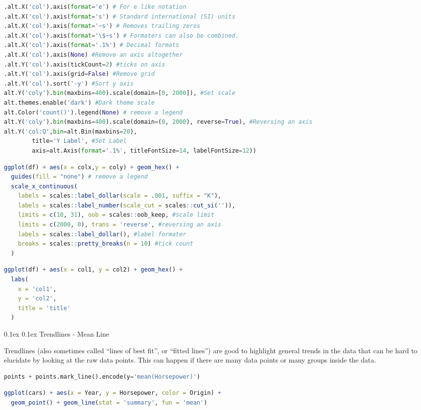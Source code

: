 \documentclass[8pt,landscape]{article}
\makeatletter
\renewcommand{\subsection}{\@startsection{subsection}{2}{0pt}%
    {0.1ex}%
    {0.1ex}%
    {\fontsize{8}{9}\bfseries\color{blue}}} %
\newcommand{\smalltext}[1]{%
  {\fontsize{8}{9}\selectfont\sloppy #1\par}%
}
\makeatother
\begin{document}
\begin{multicols}{3}
\begin{lstlisting}[language=Python]
.alt.X('col').axis(format='e') # For e like notation
.alt.X('col').axis(format='s') # Standard international (SI) units
.alt.X('col').axis(format='~s') # Removes trailing zeros
.alt.X('col').axis(format='\$~s') # Formaters can also be combined.
.alt.X('col').axis(format='.1%') # Decimal formats
.alt.X('col').axis(None) #Remove an axis altogether
.alt.Y('col').axis(tickCount=2) #ticks on axis
.alt.Y('col').axis(grid=False) #Remove grid
.alt.Y('col').sort('-y') #Sort y axis
alt.Y('coly').bin(maxbins=400).scale(domain=[0, 2000]), #Set scale
alt.themes.enable('dark') #Dark theme scale
alt.Color('count()').legend(None) # remove a legend 
alt.Y('coly').bin(maxbins=400).scale(domain=(0, 2000), reverse=True), #Reversing an axis
alt.Y('col:Q',bin=alt.Bin(maxbins=20),
        title='Y Label', #Set Label
        axis=alt.Axis(format='.1%', titleFontSize=14, labelFontSize=12))
\end{lstlisting}
\begin{lstlisting}[language=R]
ggplot(df) + aes(x = colx,y = coly) + geom_hex() +
  guides(fill = "none") # remove a legend 
  scale_x_continuous(
    labels = scales::label_dollar(scale = .001, suffix = "K"),
    labels = scales::label_number(scale_cut = scales::cut_si('')),
    limits = c(10, 31), oob = scales::oob_keep, #scale limit
    limits = c(2000, 0), trans = 'reverse', #reversing an axis
    labels = scales::label_dollar(), #label formater
    breaks = scales::pretty_breaks(n = 10) #tick count
  )
\end{lstlisting}
\begin{lstlisting}[language=R]
ggplot(df) + aes(x = col1, y = col2) + geom_hex() +
  labs(
    x = 'col1',
    y = 'col2',
    title = 'title'
  )
\end{lstlisting}

\subsection{Trendlines - Mean Line}
\smalltext{
Trendlines (also sometimes called “lines of best fit”, or “fitted lines”) are good to highlight general trends in the data that can be hard to elucidate by looking at the raw data points. This can happen if there are many data points or many groups inside the data.
}
\begin{lstlisting}[language=Python]
points + points.mark_line().encode(y='mean(Horsepower)')
\end{lstlisting}
\begin{lstlisting}[language=R]
ggplot(cars) + aes(x = Year, y = Horsepower, color = Origin) +
  geom_point() + geom_line(stat = 'summary', fun = 'mean')
\end{lstlisting}

\end{multicols}
\end{document}
